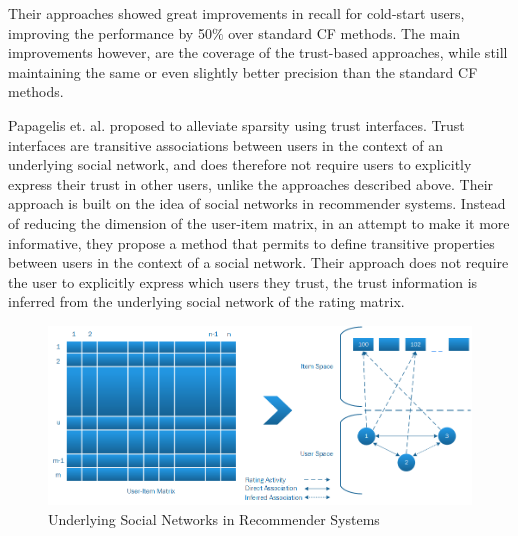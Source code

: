 Their approaches showed great improvements in recall for cold-start users,
improving the performance by 50$\%$ over standard CF methods. The main improvements however, are the coverage of the trust-based approaches, while still maintaining the same or even slightly better precision than the standard CF methods.




Papagelis et. al. \cite{Papagelis2005} proposed to alleviate sparsity using
trust interfaces. Trust interfaces are transitive associations between users in
the context of an underlying social network, and does therefore not require users to explicitly express their trust in other users, unlike the approaches described above. Their approach is built on the
idea of social networks in recommender systems. Instead of reducing the
dimension of the user-item matrix, in an attempt to make it more informative,
they propose a method that permits to define transitive properties between
users in the context of a social network. Their approach does not require the
user to explicitly express which users they trust, the trust information is
inferred from the underlying social network of the rating matrix.

\begin{figure}[H]
    \includegraphics[width=5in]{image/trustnetwork.png}
    \centering
    \caption[Underlying Social Networks in Recommender Systems]{Underlying Social Networks in Recommender Systems}
    \label{figure:cfsocialnetwork}
\end{figure}

